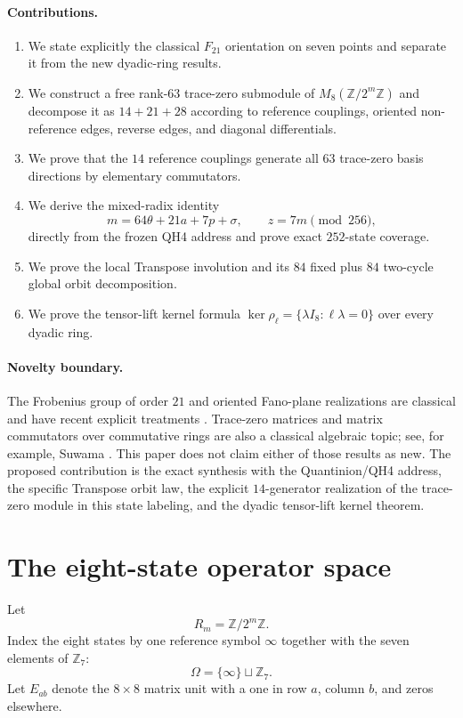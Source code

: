 \documentclass[11pt]{article}
\theoremstyle{definition}
\newcommand{\Z}{\mathbb Z}
\begin{document}
\paragraph{Contributions.}
\begin{enumerate}[leftmargin=*]
\item We state explicitly the classical $F_{21}$ orientation on seven points and separate it from the new dyadic-ring results.
\item We construct a free rank-$63$ trace-zero submodule of $M_8(\Z/2^m\Z)$ and decompose it as $14+21+28$ according to reference couplings, oriented non-reference edges, reverse edges, and diagonal differentials.
\item We prove that the $14$ reference couplings generate all $63$ trace-zero basis directions by elementary commutators.
\item We derive the mixed-radix identity
\[
m=64\theta+21a+7p+\sigma,\qquad z=7m\pmod{256},
\]
directly from the frozen QH4 address and prove exact $252$-state coverage.
\item We prove the local Transpose involution and its $84$ fixed plus $84$ two-cycle global orbit decomposition.
\item We prove the tensor-lift kernel formula $\ker\rho_\ell=\{\lambda I_8:\ell\lambda=0\}$ over every dyadic ring.
\end{enumerate}

\paragraph{Novelty boundary.}
The Frobenius group of order $21$ and oriented Fano-plane realizations are classical and have recent explicit treatments \cite{CostaPavone2024}. Trace-zero matrices and matrix commutators over commutative rings are also a classical algebraic topic; see, for example, Suwama \cite{Suwama2023}. This paper does not claim either of those results as new. The proposed contribution is the exact synthesis with the Quantinion/QH4 address, the specific Transpose orbit law, the explicit $14$-generator realization of the trace-zero module in this state labeling, and the dyadic tensor-lift kernel theorem.

\section{The eight-state operator space}
Let
\[
R_m=\Z/2^m\Z.
\]
Index the eight states by one reference symbol $\infty$ together with the seven elements of $\Z_7$:
\[
\Omega=\{\infty\}\sqcup\Z_7.
\]
Let $E_{ab}$ denote the $8\times8$ matrix unit with a one in row $a$, column $b$, and zeros elsewhere.
\end{document}
